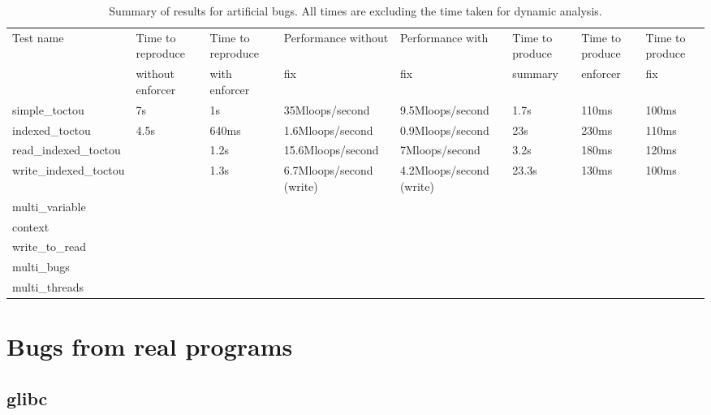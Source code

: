\begin{table}
\begin{tabular}{llllllll}
Test name       & Time to reproduce & Time to reproduce & Performance without & Performance with & Time to produce & Time to produce & Time to produce \\
                & without enforcer  & with enforcer     & fix                 & fix              & summary         & enforcer        & fix             \\
\hline
simple\_toctou  & 7s                & 1s                & 35Mloops/second     & 9.5Mloops/second & 1.7s            & 110ms           & 100ms           \\
indexed\_toctou & 4.5s              & 640ms             & 1.6Mloops/second    & 0.9Mloops/second & 23s             & 230ms           & 110ms           \\
read\_indexed\_toctou &             & 1.2s              & 15.6Mloops/second   & 7Mloops/second   & 3.2s            & 180ms           & 120ms           \\
write\_indexed\_toctou &            & 1.3s              & 6.7Mloops/second (write) & 4.2Mloops/second (write) & 23.3s & 130ms        & 100ms           \\
multi\_variable \\
context \\
write\_to\_read \\
multi\_bugs \\
multi\_threads
\end{tabular}
\caption{Summary of results for artificial bugs.  All times are
  excluding the time taken for dynamic analysis.}



\end{table}

\section{Bugs from real programs}

\subsection{glibc}

